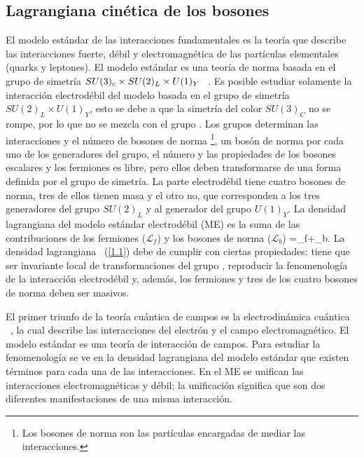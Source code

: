 \subsection{Lagrangiana cin\'etica de los bosones}
El modelo est\'andar de las interacciones fundamentales es la teor\'ia 
que describe las interacciones fuerte, d\'ebil y electromagn\'etica de las
part\'iculas elementales (quarks y leptones). El modelo est\'andar es una
teor\'ia de norma basada en el grupo de simetr\'ia $SU(3)_c\times{SU(2)_L\times U(1)_Y}$ 
~\cite{Cot200701}. Es posible estudiar solamente la interacci\'on
 electrod\'ebil del modelo basada en el grupo de simetr\'ia
$SU(2)_L\times U(1)_Y$, esto se debe a que la simetr\'ia del color $SU(3)_C$
no se rompe, por lo que no se mezcla con el grupo \gme. Los grupos determinan
las interacciones y el n\'umero de bosones de norma
\footnote{Los bosones de norma son las part\'iculas encargadas de mediar las
interacciones.}, un bos\'on de norma por cada uno de los generadores del grupo,
el n\'umero y las propiedades de los bosones escalares y los fermiones es libre,
pero ellos deben transformarse de una forma definida por el grupo de simetr\'ia.
La parte electrod\'ebil tiene cuatro bosones de norma, tres de ellos tienen masa
y el otro no, que corresponden a los tres generadores del grupo $SU(2)_L$ y al 
generador del grupo $U(1)_Y$. La densidad lagrangiana del modelo est\'andar 
electrod\'ebil (ME) es la suma de las contribuciones de los fermiones 
($\mathcal{L}_f$) y los bosones de norma ($\mathcal{L}_b$)
\be\label{1.1}
=_f+_b.
\ee 
La densidad lagrangiana ~(\ref{1.1}) debe de cumplir con ciertas propiedades:
tiene que ser invariante local de transformaciones del grupo \gme, reproducir la
fenomenolog\'ia de la interacci\'on electrod\'ebil y, adem\'as, los fermiones y 
tres de los cuatro bosones de norma deben ser masivos. 

El primer triunfo de la teor\'ia cu\'antica de campos es la electrodin\'amica
cu\'antica ~\cite{Cot200701}, la cual describe las interacciones del electr\'on
y el campo electromagn\'etico. El modelo est\'andar es una teor\'ia de
interacci\'on de campos. Para estudiar la fenomenolog\'ia se ve en la densidad
lagrangiana del modelo est\'andar que existen t\'erminos para cada una de las
interacciones. En el ME se unifican las interacciones electromagn\'eticas y
d\'ebil; la unificaci\'on significa que son dos diferentes manifestaciones de
una misma interacci\'on. 

